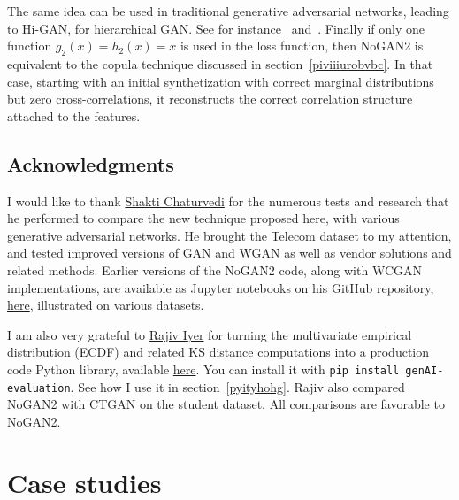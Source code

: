 \documentclass[oneside,10pt]{book}
\begin{document}
The same idea can be used in traditional generative adversarial networks, leading to Hi-GAN, for \textcolor{index}{hierarchical GAN}. 
See for instance~\cite{Weifuge} and~\cite{nathieeewgan}. Finally if only one function $g_2(x) = h_2(x) = x$ is used in the loss function,  then NoGAN2
 is equivalent to the  \textcolor{index}{copula} technique discussed in section~\ref{piviiiurobvbc}.
In that case, starting with
 an initial synthetization with correct marginal distributions but zero cross-correlations, it reconstructs the correct correlation structure attached
 to the features.

\subsection{Acknowledgments}

I would like to thank 
 \href{https://www.linkedin.com/in/shakti-chaturvedi-49aab9106/}{Shakti Chaturvedi} for the numerous tests and research that he performed to compare 
the new technique proposed here,  with various generative adversarial networks. He brought the Telecom dataset to my attention, and tested improved versions of GAN and WGAN as well as vendor solutions and related methods. Earlier versions of the NoGAN2  code, along with WCGAN implementations,  are available as Jupyter notebooks on his GitHub repository,
 \href{https://github.com/shakti2594/Shared_Folder/blob/main/Main/DeepResampling_diabates.ipynb}{here}, illustrated on various datasets. 

I am also very grateful to \href{https://www.linkedin.com/in/rajivi/}{Rajiv Iyer} for turning the multivariate empirical distribution (ECDF) and related KS distance computations 
 into a production code Python library, available \href{https://pypi.org/project/genai-evaluation/}{here}. 
You can install it with \texttt{pip install genAI-evaluation}. See how I use it in section~\ref{pyityhohg}.
Rajiv also compared NoGAN2 with CTGAN on the student dataset. All comparisons are favorable to NoGAN2.


\section{Case studies}\label{daberikh}
\end{document}
